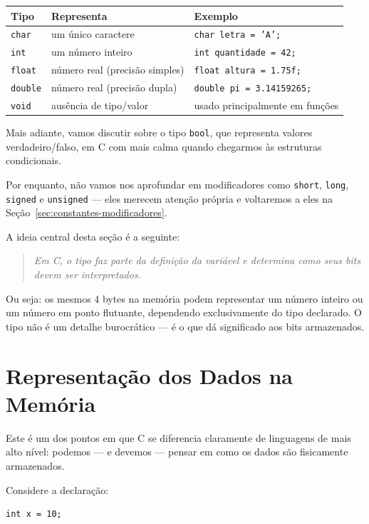 \documentclass[12pt,a4paper,oneside]{extreport}
\begin{document}
\begin{center}
\begin{tabular}{|l|l|l|}
\hline
\textbf{Tipo} & \textbf{Representa} & \textbf{Exemplo} \\
\hline
\texttt{char} & um único caractere & \texttt{char letra = 'A';} \\
\hline
\texttt{int} & um número inteiro & \texttt{int quantidade = 42;} \\
\hline
\texttt{float} & número real (precisão simples) & \texttt{float altura = 1.75f;} \\
\hline
\texttt{double} & número real (precisão dupla) & \texttt{double pi = 3.14159265;} \\
\hline
\texttt{void} & ausência de tipo/valor & usado principalmente em funções \\
\hline
\end{tabular}
\end{center}

Mais adiante, vamos discutir sobre o tipo \texttt{bool}, que representa valores verdadeiro/falso, em C com mais calma quando chegarmos às estruturas condicionais.

Por enquanto, não vamos nos aprofundar em modificadores como \texttt{short}, \texttt{long}, \texttt{signed} e \texttt{unsigned} — eles merecem atenção própria e voltaremos a eles na Seção~\ref{sec:constantes-modificadores}.

A ideia central desta seção é a seguinte:

\begin{quote}
\textit{Em C, o tipo faz parte da definição da variável e determina como seus bits devem ser interpretados.}
\end{quote}

Ou seja: os mesmos 4 bytes na memória podem representar um número inteiro ou um número em ponto flutuante, dependendo exclusivamente do tipo declarado. O tipo não é um detalhe burocrático — é o que dá significado aos bits armazenados.

\section{Representação dos Dados na Memória}
Este é um dos pontos em que C se diferencia claramente de linguagens de mais alto nível: podemos — e devemos — pensar em como os dados são fisicamente armazenados.

Considere a declaração:

\begin{lstlisting}
int x = 10;
\end{lstlisting}
\end{document}
